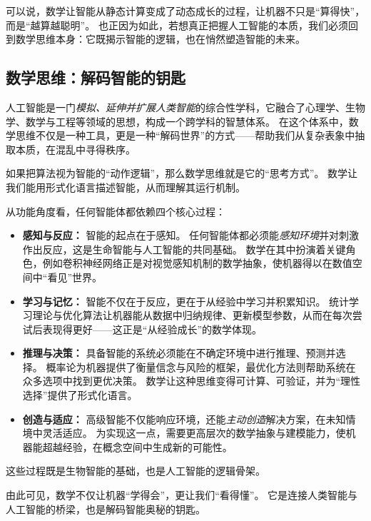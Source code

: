 可以说，数学让智能从静态计算变成了动态成长的过程，让机器不只是“算得快”，而是“越算越聪明”。
也正因为如此，若想真正把握人工智能的本质，我们必须回到数学思维本身：它既揭示智能的逻辑，也在悄然塑造智能的未来。  

\subsection{数学思维：解码智能的钥匙}
人工智能是一门\emph{模拟、延伸并扩展人类智能}的综合性学科，它融合了心理学、生物学、数学与工程等领域的思想，构成一个跨学科的智慧体系。
在这个体系中，数学思维不仅是一种工具，更是一种“解码世界”的方式——帮助我们从复杂表象中抽取本质，在混乱中寻得秩序。

如果把算法视为智能的“动作逻辑”，那么数学思维就是它的“思考方式”。
数学让我们能用形式化语言描述智能，从而理解其运行机制。

从功能角度看，任何智能体都依赖四个核心过程：
\begin{itemize}
\item \textbf{感知与反应：} 智能的起点在于感知。  
任何智能体都必须能\emph{感知环境}并对刺激作出反应，这是生命智能与人工智能的共同基础。  
数学在其中扮演着关键角色，例如卷积神经网络正是对视觉感知机制的数学抽象，使机器得以在数值空间中“看见”世界。

\item \textbf{学习与记忆：} 智能不仅在于反应，更在于从经验中学习并积累知识。  
统计学习理论与优化算法让机器能从数据中归纳规律、更新模型参数，从而在每次尝试后表现得更好——这正是“从经验成长”的数学体现。

\item \textbf{推理与决策：} 具备智能的系统必须能在不确定环境中进行推理、预测并选择。
概率论为机器提供了衡量信念与风险的框架，最优化方法则帮助系统在众多选项中找到更优决策。
数学让这种思维变得可计算、可验证，并为“理性选择”提供了形式化语言。

\item \textbf{创造与适应：} 高级智能不仅能响应环境，还能\emph{主动创造}解决方案，在未知情境中灵活适应。  
为实现这一点，需要更高层次的数学抽象与建模能力，使机器能超越经验，在概念空间中生成新的可能性。
\end{itemize}

这些过程既是生物智能的基础，也是人工智能的逻辑骨架。

由此可见，数学不仅让机器“学得会”，更让我们“看得懂”。  
它是连接人类智能与人工智能的桥梁，也是解码智能奥秘的钥匙。  


